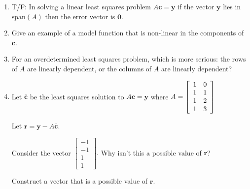 \documentclass[12pt,letterpaper,noanswers]{exam}
\begin{document}
\begin{enumerate}[resume]
\item T/F: In solving a linear least squares problem $A\mathbf{c} = \mathbf{y}$ if the vector $\mathbf{y}$ lies in $\text{span}(A)$ then the error vector is $\mathbf{0}$.
\item Give an example of a model function that is non-linear in the components of $\mathbf{c}$.
\item For an overdetermined least squares problem, which is more serious: the rows of $A$ are linearly dependent, or the columns of $A$ are linearly dependent?
\item Let $\overline{\mathbf{c}}$ be the least squares  solution to $A\mathbf{c} = \mathbf{y}$ where $A = \left[\begin{array}{c c} 1 & 0 \\
1 & 1 \\
1 & 2 \\
 1 & 3\end{array}\right]$

Let $\mathbf{r} = \mathbf{y} - A\overline{\mathbf{c}}$.

Consider the vector $\left[\begin{array}{r}-1 \\ -1 \\ 1 \\ 1\end{array}\right].$  Why isn't this a possible value of $\mathbf{r}$?

Construct a vector that is a possible value of $\mathbf{r}$.
 
\end{enumerate}
\end{document}
